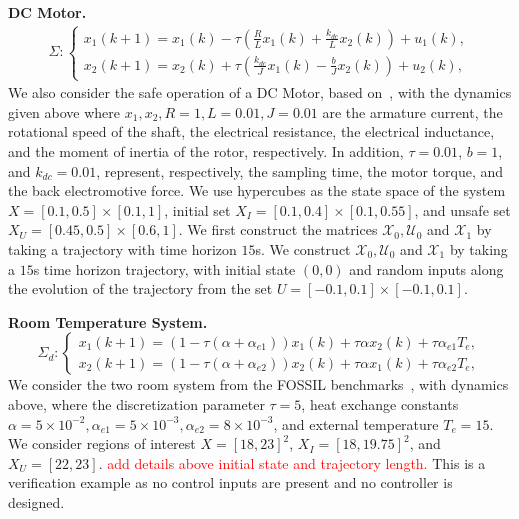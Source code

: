 \documentclass[sigconf]{acmart}
\newcommand{\BW}{\textcolor{red}}
\begin{document}
\noindent\textbf{DC Motor.}
\begin{align*}
\Sigma : \begin{cases}
x_1(k+1) = x_1(k) - \tau(\frac{R}{L}x_1(k) + \frac{k_{dc}}{L}x_2(k)) + u_1(k), \\
x_2(k+1) = x_2(k) + \tau(\frac{k_{dc}}{J}x_1(k) - \frac{b}{J}x_2(k)) + u_2(k),
\end{cases}
\end{align*}
We also consider the safe operation of a DC Motor, based on~\cite{adewuyi2013dc}, with the dynamics given above where $x_1,x_2,R=1,L=0.01,J=0.01$ are the armature current, the rotational speed of the shaft, the electrical resistance, the electrical inductance, and the moment of inertia of the rotor, respectively. In addition, $\tau=0.01$, $b=1$, and $k_{dc}=0.01$, represent, respectively, the sampling time, the motor torque, and the back electromotive force. We use hypercubes as the state space of the system $X=[0.1,0.5]\times[0.1,1]$, initial set $X_I=[0.1,0.4]\times[0.1,0.55]$, and unsafe set $X_U=[0.45,0.5]\times[0.6,1]$. We first construct the matrices $\mathcal{X}_{0},\mathcal{U}_{0}$ and $\mathcal{X}_{1}$ by taking a trajectory with time horizon $15$s. We construct $\mathcal{X}_{0},\mathcal{U}_{0}$ and $\mathcal{X}_{1}$ by taking a $15$s time horizon trajectory, with initial state $(0,0)$ and random inputs along the evolution of the trajectory from the set $U=[-0.1,0.1]\times[-0.1,0.1]$.

\noindent\textbf{Room Temperature System.}
\begin{equation*}
\Sigma_d:\begin{cases}
x_1(k+1) = (1 - \tau(\alpha + \alpha_{e1}))x_1(k) + \tau\alpha x_2(k) + \tau\alpha_{e1} T_e,\\
x_2(k+1) = (1 - \tau(\alpha + \alpha_{e2}))x_2(k) + \tau\alpha x_1(k) + \tau\alpha_{e2}T_e,
\end{cases}
\end{equation*}
We consider the two room system from the FOSSIL benchmarks~\cite{abate2021fossil}, with dynamics above, where the discretization parameter $\tau = 5$, heat exchange constants $\alpha = 5\times 10^{-2}, \alpha_{e1} = 5\times 10^{-3}, \alpha_{e2} = 8\times10^{-3}$, and external temperature $T_e = 15$. We consider regions of interest $X=[18,23]^2$, $X_I=[18,19.75]^2$, and $X_U=[22,23]$. \BW{add details above initial state and trajectory length.} This is a verification example as no control inputs are present and no controller is designed.
\end{document}
